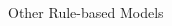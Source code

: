 \documentclass[10pt,compress,t,notes=noshow, xcolor=table]{beamer}
\begin{document}
\begin{frame}[t]{Other Rule-based Models}
\begin{columns}[c, totalwidth=\textwidth]
\begin{column}{0.65\textwidth}
    \end{column}
    \begin{column}{0.35\textwidth}
    \vspace{\dimexpr-2\parsep-2\parskip\relax}
        \begin{center}
        \end{center}
    \end{column}
\end{columns}
\end{frame}
\endlecture
\end{document}
